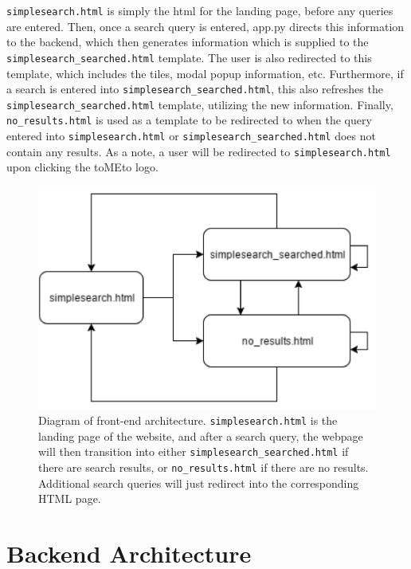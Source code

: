 \documentclass{acm_proc_article-sp}
\begin{document}
\texttt{simplesearch.html} is simply the html for the landing page, before any queries are entered. Then, once a search query is entered, app.py directs this information to the backend, which then generates information which is supplied to the \texttt{simplesearch\_searched.html} template. The user is also redirected to this template, which includes the tiles, modal popup information, etc. Furthermore, if a search is entered into \texttt{simplesearch\_searched.html}, this also refreshes the \texttt{simplesearch\_searched.html} template, utilizing the new information. Finally, \texttt{no\_results.html} is used as a template to be redirected to when the query entered into \texttt{simplesearch.html} or \texttt{simplesearch\_searched.html} does not contain any results. As a note, a user will be redirected to \texttt{simplesearch.html} upon clicking the toMEto logo.

\begin{figure}[h]
\centering
\includegraphics[scale=0.5]{p4.png}
\caption{Diagram of front-end architecture. \texttt{simplesearch.html} is the landing page of the website,
and after a search query, the webpage will then transition into either \texttt{simplesearch\_searched.html} if there are search results, or \texttt{no\_results.html} if there are no results. Additional search queries will just redirect into the corresponding HTML page.}
\end{figure}


\section{Backend Architecture}
\end{document}
